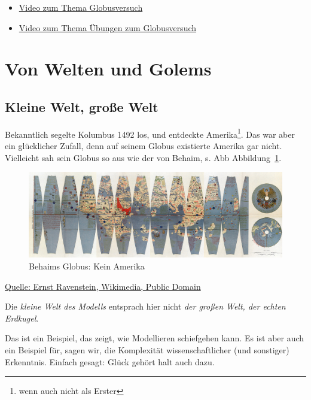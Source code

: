 \documentclass[
  a4paper,
  DIV=11]{scrreprt}
\providecommand{\tightlist}{%
  \setlength{\itemsep}{0pt}\setlength{\parskip}{0pt}}\usepackage{longtable,booktabs,array}
\theoremstyle{definition}
\theoremstyle{remark}
\begin{document}
\begin{itemize}
\tightlist
\item
  \href{https://youtu.be/fGlt9Ld4xzk}{Video zum Thema Globusversuch}
\item
  \href{https://youtu.be/YJEZiQvCBgs}{Video zum Thema Übungen zum
  Globusversuch}
\end{itemize}

\hypertarget{von-welten-und-golems}{%
\section{Von Welten und Golems}\label{von-welten-und-golems}}

\hypertarget{kleine-welt-grouxdfe-welt}{%
\subsection{Kleine Welt, große Welt}\label{kleine-welt-grouxdfe-welt}}

Bekanntlich segelte Kolumbus 1492 los, und entdeckte Amerika\footnote{wenn
  auch nicht als Erster}. Das war aber ein glücklicher Zufall, denn auf
seinem Globus existierte Amerika gar nicht. Vielleicht sah sein Globus
so aus wie der von Behaim, s. Abb Abbildung~\ref{fig-behaim}.

\begin{figure}

{\centering \includegraphics{./img/Behaim.jpg}

}

\caption{\label{fig-behaim}Behaims Globus: Kein Amerika}

\end{figure}

\href{https://commons.wikimedia.org/wiki/File:RavensteinBehaim.jpg}{Quelle:
Ernst Ravenstein, Wikimedia, Public Domain}

Die \emph{kleine Welt des Modells} entsprach hier nicht \emph{der großen
Welt, der echten Erdkugel}.

Das ist ein Beispiel, das zeigt, wie Modellieren schiefgehen kann. Es
ist aber auch ein Beispiel für, sagen wir, die Komplexität
wissenschaftlicher (und sonstiger) Erkenntnis. Einfach gesagt: Glück
gehört halt auch dazu.
\end{document}
